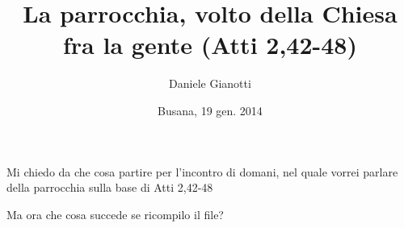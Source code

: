 \documentclass[a4paper,12pt,article,oneside]{memoir} %
\title{La parrocchia, volto della Chiesa fra la gente (Atti 2,42-48)}
\author{Daniele Gianotti}
\date{Busana, 19 gen. 2014}
\begin{document}
\maketitle
\thispagestyle{empty}

Mi chiedo da che cosa partire per l’incontro di domani, nel quale vorrei parlare della parrocchia sulla base di Atti 2,42-48

Ma ora che cosa succede se ricompilo il file?
\end{document}
